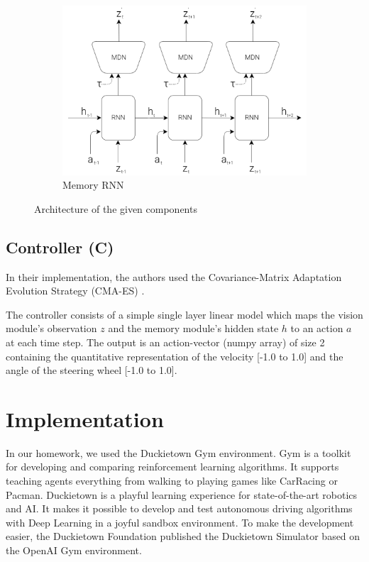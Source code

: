 \documentclass{article}
\begin{document}
\begin{figure}[!ht]
\begin{subfigure}[b]{.54\textwidth}
        \includegraphics[width=\textwidth]{RNN.png}
        \caption{Memory RNN}
        \label{fig:rnn}
    \end{subfigure}
    \caption{Architecture of the given components}
    \label{fig:architecture}
\end{figure}

\subsection{Controller (C)}
In their implementation, the authors used the Covariance-Matrix Adaptation Evolution Strategy
(CMA-ES) \cite{cma}.

The controller consists of a simple single layer linear model which maps the vision module’s observation $z$ and the memory module’s hidden state $h$ to an action $a$ at each time step. The output is an action-vector (numpy array) of size 2 containing the quantitative representation of the velocity [-1.0 to 1.0] and the angle of the steering wheel [-1.0 to 1.0].


\section{Implementation}


In our homework, we used the Duckietown Gym \cite{gym_duckietown} environment. Gym \cite{gym} is a toolkit for developing and comparing reinforcement learning algorithms. It supports teaching agents everything from walking to playing games like CarRacing or Pacman. Duckietown is a playful learning experience for state-of-the-art robotics and AI. It makes it possible to develop and test autonomous driving algorithms with Deep Learning in a joyful sandbox environment. To make the development easier, the Duckietown Foundation published the Duckietown Simulator based on the OpenAI Gym environment.
\end{document}

